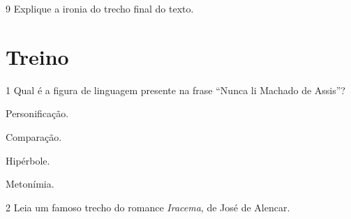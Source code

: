 \num{9} Explique a ironia do trecho final do texto.


\section*{Treino}

\num{1} Qual é a figura de linguagem presente na frase ``Nunca li Machado de Assis''?

\begin{multicols}{2}
\begin{escolha}

  \item Personificação.
  
  \item Comparação.
  
  \item Hipérbole.
  
  \item Metonímia. 

\end{escolha}
\end{multicols}

\num{2} Leia um famoso trecho do romance \textit{Iracema}, de José de Alencar.
\enlargethispage{2\baselineskip}

